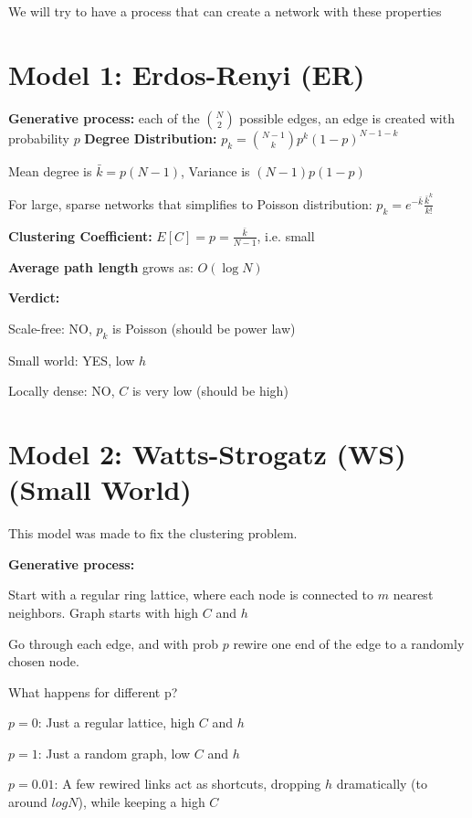 We will try to have a process that can create a network with these properties 

\section*{Model 1: Erdos-Renyi (ER)}


\textbf{Generative process:} each of the $\binom{N}{2}$ possible edges, an edge is created with 
probability $p$
\textbf{Degree Distribution:} 
$
p_k = \binom{N-1}{k}p^k (1-p)^{N-1-k}
$

Mean degree is $\bar{k} = p(N-1)$, Variance is $(N-1)p(1-p)$

For large, sparse networks that simplifies to Poisson distribution:
$
p_k = e^{-\bar{k}} \frac{\bar{k}^k}{k!}
$

\textbf{Clustering Coefficient:} $E[C] = p = \frac{\bar{k}}{N-1}$, i.e. small

\textbf{Average path length} grows as: $O(\log N)$

\textbf{Verdict:}
\begin{tightitemize}
    \item Scale-free: NO, $p_k$ is Poisson (should be power law)
    \item Small world: YES, low $h$
    \item Locally dense: NO, $C$ is very low (should be high)
\end{tightitemize}

\section*{Model 2: Watts-Strogatz (WS) (Small World)}

This model was made to fix the clustering problem. 

\textbf{Generative process:}
\begin{tightitemize}
    \item Start with a regular ring lattice, where each node is connected to 
    $m$ nearest neighbors. Graph starts with high $C$ and $h$
    \item Go through each edge, and with prob $p$ rewire one end of the edge 
    to a randomly chosen node. 
\end{tightitemize}

What happens for different p?
\begin{tightitemize}
    \item $p = 0$: Just a regular lattice, high $C$ and $h$
    \item $p = 1$: Just a random graph, low $C$ and $h$
    \item $p = 0.01$: A few rewired links act as shortcuts, dropping 
    $h$ dramatically (to around $log N$), while keeping a high $C$
\end{tightitemize}

